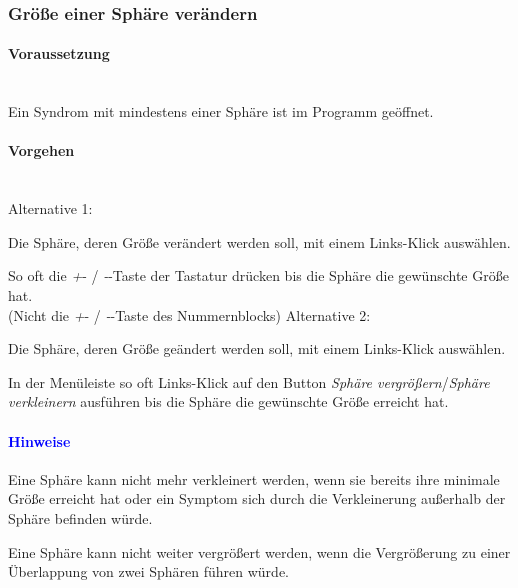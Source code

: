 \documentclass[enabledeprecatedfontcommands,fontsize=11pt,paper=a4,twoside]{scrartcl}
\newcounter{one}
\newcounter{two}[one]
\newcommand*{\hint}{\paragraph{\textcolor{blue}{Hinweise}}}
\newcommand*{\condition}{\paragraph{Voraussetzung}$\;$ \vspace{0.2cm}\\}
\newcommand*{\actions}{\paragraph{Vorgehen} $\;$\vspace{0.2cm}\\}
\newcommand*{\aOne}{\textcolor{bbe}{Alternative 1:}}
\newcommand*{\aTwo}{\textcolor{bbe}{Alternative 2:}}
\let\tempone\itemize
\let\temptwo\enditemize
\renewenvironment{itemize}{\tempone\addtolength{\itemsep}{-10.0pt}}{\temptwo}
\let\origenumerate\enumerate
\let\origendenumerate\endenumerate
\renewenvironment{enumerate}{\origenumerate \addtolength{\itemsep}{-10.0pt}}{\origendenumerate}
\begin{document}
\subsubsection{Größe einer Sphäre verändern}
				\condition 	
		Ein Syndrom mit mindestens einer Sphäre ist im Programm geöffnet. 
		\actions  
		\aOne
		\begin{enumerate}
			\item Die Sphäre, deren Größe verändert werden soll, mit einem Links-Klick auswählen.
			\item So oft die \glqq\textit{+}\grqq- / \glqq\textit{-}\grqq-Taste der Tastatur drücken bis die Sphäre die gewünschte Größe hat. \\(Nicht die \glqq\textit{+}\grqq- / \glqq\textit{-}\grqq-Taste des Nummernblocks)
		\end{enumerate}
		\aTwo
			\begin{enumerate}
			\item Die Sphäre, deren Größe geändert werden soll, mit einem Links-Klick auswählen.
			\item In der Menüleiste so oft  Links-Klick auf den Button \textit{Sphäre vergrößern}/\textit{Sphäre verkleinern} ausführen bis die Sphäre die gewünschte Größe erreicht hat. 
		\end{enumerate}
		\hint
		\begin{itemize}
			\item Eine Sphäre kann nicht mehr verkleinert werden, wenn sie bereits ihre minimale Größe erreicht hat oder ein Symptom sich durch die Verkleinerung außerhalb der Sphäre befinden würde.
			\item Eine Sphäre kann nicht weiter vergrößert werden, wenn die Vergrößerung zu einer Überlappung von zwei Sphären führen würde.\\
		\end{itemize}
				
\end{document}
